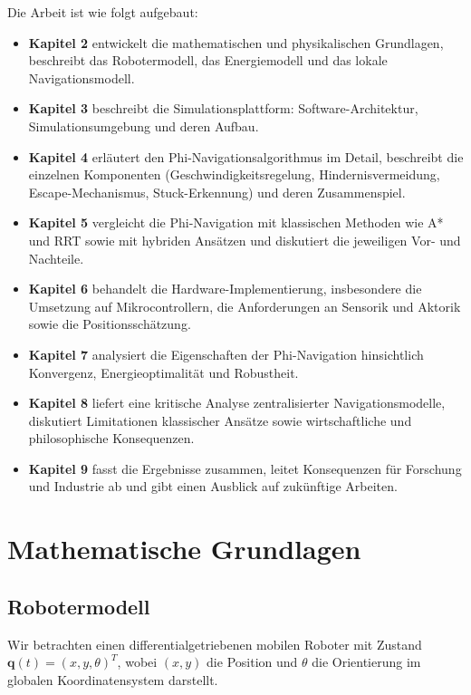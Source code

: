 ﻿\documentclass[a4paper,12pt]{article}
\theoremstyle{definition}
\begin{document}
Die Arbeit ist wie folgt aufgebaut:
\begin{itemize}
	\item \textbf{Kapitel 2} entwickelt die mathematischen und physikalischen Grundlagen, beschreibt das Robotermodell, das Energiemodell und das lokale Navigationsmodell.
	\item \textbf{Kapitel 3} beschreibt die Simulationsplattform: Software-Architektur, Simulationsumgebung und deren Aufbau.
	\item \textbf{Kapitel 4} erläutert den Phi-Navigationsalgorithmus im Detail, beschreibt die einzelnen Komponenten (Geschwindigkeitsregelung, Hindernisvermeidung, Escape-Mechanismus, Stuck-Erkennung) und deren Zusammenspiel.
	\item \textbf{Kapitel 5} vergleicht die Phi-Navigation mit klassischen Methoden wie A* und RRT sowie mit hybriden Ansätzen und diskutiert die jeweiligen Vor- und Nachteile.
	\item \textbf{Kapitel 6} behandelt die Hardware-Implementierung, insbesondere die Umsetzung auf Mikrocontrollern, die Anforderungen an Sensorik und Aktorik sowie die Positionsschätzung.
	\item \textbf{Kapitel 7} analysiert die Eigenschaften der Phi-Navigation hinsichtlich Konvergenz, Energieoptimalität und Robustheit.
	\item \textbf{Kapitel 8} liefert eine kritische Analyse zentralisierter Navigationsmodelle, diskutiert Limitationen klassischer Ansätze sowie wirtschaftliche und philosophische Konsequenzen.
	\item \textbf{Kapitel 9} fasst die Ergebnisse zusammen, leitet Konsequenzen für Forschung und Industrie ab und gibt einen Ausblick auf zukünftige Arbeiten.
\end{itemize}

\section{Mathematische Grundlagen}

\subsection{Robotermodell}

Wir betrachten einen differentialgetriebenen mobilen Roboter mit Zustand $\mathbf{q}(t) = (x, y, \theta)^T$, wobei $(x,y)$ die Position und $\theta$ die Orientierung im globalen Koordinatensystem darstellt.
\end{document}
